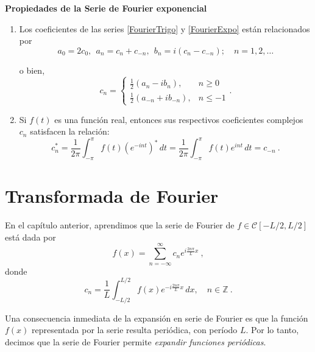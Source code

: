 \begin{propiedad} 
    \textbf{Propiedades de la Serie de Fourier exponencial}
    \begin{enumerate}
        \item Los coeficientes de las series \eqref{FourierTrigo} y \eqref{FourierExpo} están relacionados por 
        \begin{equation}
        a_0 = 2c_0,~~ a_n = c_n + c_{-n}, ~~ b_n = i(c_n - c_{-n}); \quad n = 1,2, \dots    \label{RelacionCoefi1}
        \end{equation}
        
        o bien, 
        \begin{equation}
            c_n = \left\{ \begin{array}{cl}
                \frac{1}{2} (a_n - ib_n), & n \geq 0  \\
            \frac{1}{2}(a_{-n} + i b_{-n}),     & n  \leq -1 
            \end{array} \right. . \label{RelacionCoefi2}
        \end{equation}

        \item Si $f(t)$ es una función real, entonces sus respectivos coeficientes complejos $c_n$ satisfacen la relación:
        $$c_n^* = \frac{1}{2\pi} \int_{-\pi}^{\pi} f(t) (e^{-int})^* \,dt = \frac{1}{2\pi} \int_{-\pi}^{\pi} f(t) e^{int} \,dt = c_{-n}\ .$$
    \end{enumerate}
\end{propiedad}




\section{Transformada de Fourier}

En el capítulo anterior, aprendimos que la serie de Fourier de $f \in \mathscr{C}[-L/2,L/2]$ está dada por 
\begin{equation} \label{Transformada1}
  f(x) = \sum_{n=-\infty}^{\infty} c_n e^{i \frac{2n\pi}{L}x} \ ,  
\end{equation}
donde 
\begin{equation} \label{Transformada2}
  c_n = \frac{1}{L} \int_{-L/2}^{L/2} f(x) e^{-i\frac{2n\pi}{L}x} \,dx, \quad n \in \mathbb{Z} \ . 
\end{equation}

Una consecuencia inmediata de la expansión en serie de Fourier es que la función $f(x)$ representada por la serie resulta periódica, con período $L$. Por lo tanto, decimos que la serie de Fourier permite \emph{expandir funciones periódicas}. 


